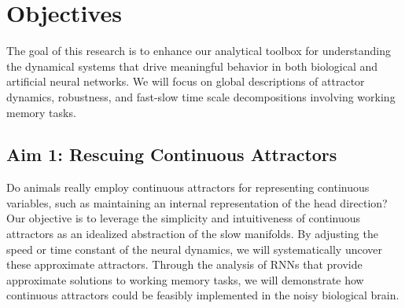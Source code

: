 \documentclass[12pt,letterpaper, onecolumn]{article}
\theoremstyle{definition}
\theoremstyle{remark}
\begin{document}
%
%


\newpage
\section{Objectives}

The goal of this research is to enhance our analytical toolbox for understanding the dynamical systems that drive meaningful behavior in both biological and artificial neural networks.
We will focus on global descriptions of attractor dynamics, robustness, and fast-slow time scale decompositions involving working memory tasks.

\subsection*{Aim 1: Rescuing Continuous Attractors}
Do animals really employ continuous attractors for representing continuous variables, such as maintaining an internal representation of the head direction?
Our objective is to leverage the simplicity and intuitiveness of continuous attractors as an idealized abstraction of the slow manifolds.
By adjusting the speed or time constant of the neural dynamics, we will systematically uncover these approximate attractors.
Through the analysis of RNNs that provide approximate solutions to working memory tasks, we will demonstrate how continuous attractors could be feasibly implemented in the noisy biological brain.
\end{document}
